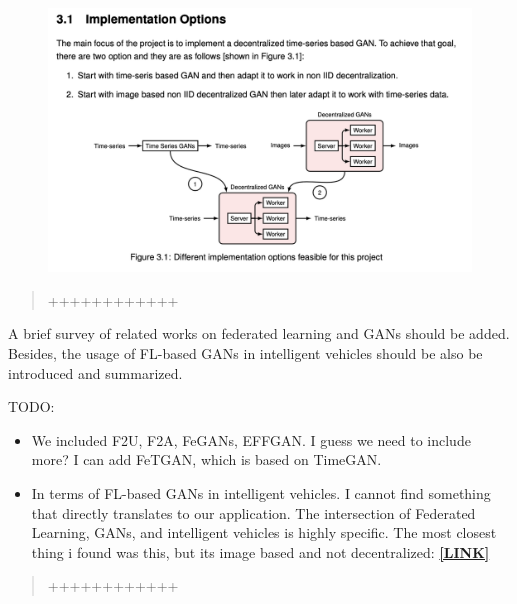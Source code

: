 \documentclass{article}
\begin{document}
\begin{figure}[htp]
    \centering
\includegraphics[scale=0.55]{Reply_to_comments/implementations.png}
\end{figure}

\begin{quote}
	++++++++++++
\end{quote}

\RC A brief survey of related works on federated learning and GANs should be added. Besides, the usage of FL-based GANs in intelligent vehicles should be also be introduced and summarized.

\AR TODO: 
\begin{itemize}
    \item We included F2U, F2A, FeGANs, EFFGAN. I guess we need to include more? I can add FeTGAN, which is based on TimeGAN.
    \item In terms of FL-based GANs in intelligent vehicles. I cannot find something that directly translates to our application. The intersection of Federated Learning, GANs, and intelligent vehicles is highly specific. The most closest thing i found was this, but its image based and not decentralized: \href{https://openaccess.thecvf.com/content/WACV2021W/AVV/papers/Xu_Reliability_of_GAN_Generated_Data_to_Train_and_Validate_Perception_WACVW_2021_paper.pdf}{\textbf{[LINK]}}
\end{itemize}

\begin{quote}
	++++++++++++
\end{quote}
\end{document}
